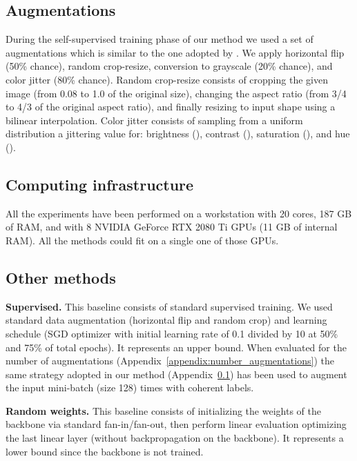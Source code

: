\documentclass{article}
\begin{document}
\subsection{Augmentations}\label{appendix:augmentations}

During the self-supervised training phase of our method we used a set of augmentations which is similar to the one adopted by \cite{chen2020simple}. We apply horizontal flip (50\% chance), random crop-resize, conversion to grayscale (20\% chance), and color jitter (80\% chance). Random crop-resize consists of cropping the given image (from 0.08 to 1.0 of the original size), changing the aspect ratio (from 3/4 to 4/3 of the original aspect ratio), and finally resizing to input shape using a bilinear interpolation. Color jitter consists of sampling from a uniform distribution  a jittering value for: brightness (), contrast (), saturation (), and hue ().

\subsection{Computing infrastructure} \label{appendix:computing_infrastracture}

All the experiments have been performed on a workstation with 20 cores, 187 GB of RAM, and with 8 NVIDIA GeForce RTX 2080 Ti GPUs (11 GB of internal RAM). All the methods could fit on a single one of those GPUs.

\subsection{Other methods}

\textbf{Supervised.} This baseline consists of standard supervised training. We used standard data augmentation (horizontal flip and random crop) and learning schedule (SGD optimizer with initial learning rate of 0.1 divided by 10 at 50\% and 75\% of total epochs). It represents an upper bound. When evaluated for the number of augmentations (Appendix~\ref{appendix:number_augmentations}) the same strategy adopted in our method (Appendix~\ref{appendix:augmentations}) has been used to augment the input mini-batch (size 128)  times with coherent labels.

\textbf{Random weights.} This baseline consists of initializing the weights of the backbone via standard fan-in/fan-out, then perform linear evaluation optimizing the last linear layer (without backpropagation on the backbone). It represents a lower bound since the backbone is not trained.
\end{document}
